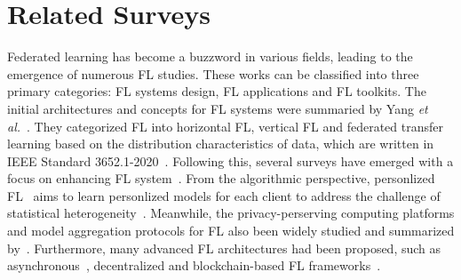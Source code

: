 \section{Related Surveys}
\label{sec:related}
Federated learning has become a buzzword in various fields, leading to the emergence of numerous FL studies.
These works can be classified into three primary categories: FL systems design, FL applications and FL toolkits. %
The initial architectures and concepts for FL systems were summaried by Yang \textit{et al.}~\cite{yang2019federated}. 
They categorized FL into horizontal FL, vertical FL and federated transfer learning based on the distribution characteristics of data, 
which are written in IEEE Standard 3652.1-2020~\cite{yang2021white, IEEEstd3652}. 
Following this, several surveys have emerged with a focus on enhancing FL system~\cite{li2020federated,aledhari2020federated, kairouz2021advances, zhang2021survey, li2021survey}. 
From the algorithmic perspective, personlized FL~\cite{kulkarni2020survey, tan2022towards} aims to learn personlized models for each client to address the challenge of statistical heterogeneity~\cite{ma2022state}.
Meanwhile, the privacy-perserving computing platforms and model aggregation protocols for FL also been widely studied and summarized by~\cite{liu2022privacy,el2022differential,yin2021comprehensive,lyu2020threats}.
Furthermore, many advanced FL architectures had been proposed, such as asynchronous~\cite{xu2023asynchronous}, decentralized and blockchain-based FL frameworks~\cite{nguyen2021federated, qu2022blockchain, zhu2022blockchain}.

